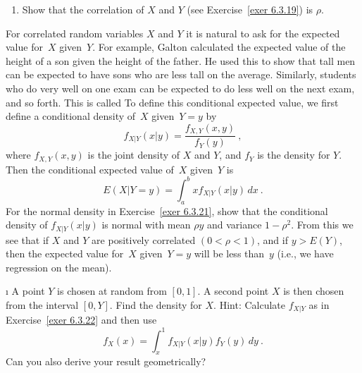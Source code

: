 {\begin{LJSItem}
\begin{enumerate}
\item Show that the correlation of $X$ and $Y$ (see Exercise~\ref{exer 6.3.19}) is
$\rho$.
\end{enumerate}

\istar\label{exer 6.3.22} For correlated random variables $X$ and $Y$ it is natural to
ask for the expected value for~$X$ given~$Y$.  For example, Galton calculated the
expected value of the height of a son given the height of the father.  He used this
to show that tall men can be expected to have sons who are less tall on the average. 
Similarly, students who do very well on one exam can be expected to do less well on
the next exam, and so forth.  This is called    To define this conditional expected value, we first define a conditional density of~$X$
given~$Y = y$ by
$$ f_{X|Y}(x|y) = \frac {f_{X,Y}(x,y)}{f_Y(y)}\ ,
$$ where $f_{X,Y}(x,y)$ is the joint density of $X$ and $Y$, and $f_Y$ is the density
for $Y$.  Then the conditional expected value of~$X$ given~$Y$ is
$$ E(X|Y = y) = \int_a^b x f_{X|Y}(x|y)\, dx\ .
$$ For the normal density in Exercise~\ref{exer 6.3.21}, show that the conditional
density of $f_{X|Y}(x|y)$ is normal with mean $\rho y$ and variance $1 - \rho^2$. 
From this we see that if $X$ and $Y$ are positively correlated $(0 < \rho < 1)$,
and if $y > E(Y)$, then the expected value for~$X$ given~$Y = y$ will be less than~$y$
(i.e., we have regression on the mean). 

\i\label{exer 6.3.23} A point $Y$ is chosen at random from $[0,1]$.  A second
point $X$ is then chosen from the interval $[0,Y]$.  Find the density for $X$.  \emx
{Hint}: Calculate $f_{X|Y}$ as in Exercise~\ref{exer 6.3.22} and then use
$$ f_X(x) = \int_x^1 f_{X|Y}(x|y) f_Y(y)\, dy\ .
$$ Can you also derive your result geometrically?



\end{LJSItem}}
